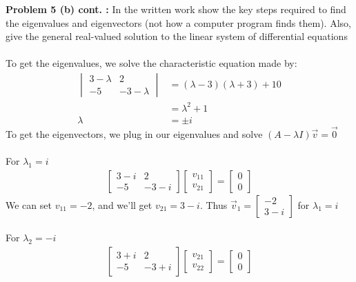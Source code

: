 \documentclass[12pt]{article}
\begin{document}
\noindent \textbf{Problem 5 (b) cont. : }In the written work show the key steps required to find the eigenvalues and eigenvectors (not how a computer program finds them). Also, give the general real-valued solution to the linear system of differential equations
\\ \\
To get the eigenvalues, we solve the characteristic equation made by:
\begin{align*}
\begin{vmatrix}
3 - \lambda & 2 \\
-5 & -3 - \lambda 
\end{vmatrix}
&= (\lambda - 3)(\lambda + 3) + 10  \\
&= \lambda^2 + 1 \\
\lambda &= \pm i
\end{align*}
To get the eigenvectors, we plug in our eigenvalues and solve $(A - \lambda I)\vec{v} = \vec{0}$
\\ \\
For $\lambda_1 = i$
\begin{align*}
\begin{bmatrix}
3 - i & 2 \\ -5 & -3 - i
\end{bmatrix}
\begin{bmatrix}
v_{11} \\ v_{21}
\end{bmatrix}
= 
\begin{bmatrix}
0 \\ 0
\end{bmatrix}
\end{align*} 
We can set $v_{11} = -2$, and we'll get $v_{21} = 3-i$. Thus $\vec{v}_1 = \begin{bmatrix}	-2 \\ 3-i	\end{bmatrix}$ for $\lambda_1 = i$
\\ \\ 
For $\lambda_2 = -i$
\begin{align*}
\begin{bmatrix}
3 + i & 2 \\ -5 & -3 + i
\end{bmatrix}
\begin{bmatrix}
v_{21} \\ v_{22}
\end{bmatrix}
= 
\begin{bmatrix}
0 \\ 0
\end{bmatrix}
\end{align*} 
\end{document}
